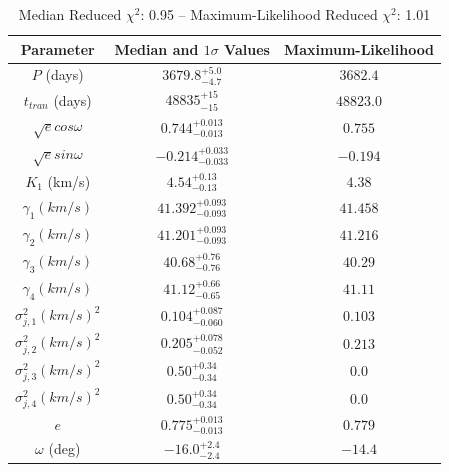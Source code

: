 \documentclass{article}
\begin{document}
\begin{table}
\centering
\caption{Median Reduced $\chi^2$: 0.95 -- Maximum-Likelihood Reduced $\chi^2$: 1.01}
\begin{tabular}{| c | c | c |}
\hline
Parameter & Median and $1 \sigma$ Values & Maximum-Likelihood \\
\hline
$P$ (days) & $3679.8^{+5.0}_{-4.7}$ & $3682.4$ \\
\hline
$t_{tran}$ (days) & $48835^{+15}_{-15}$ & $48823.0$ \\
\hline
$\sqrt{e} cos\omega$ & $0.744^{+0.013}_{-0.013}$ & $0.755$ \\
\hline
$\sqrt{e} sin\omega$ & $-0.214^{+0.033}_{-0.033}$ & $-0.194$ \\
\hline
$K_1$ (km/s) & $4.54^{+0.13}_{-0.13}$ & $4.38$ \\
\hline
$\gamma_{1} (km/s)$ & $41.392^{+0.093}_{-0.093}$ & $41.458$ \\
\hline
$\gamma_{2} (km/s)$ & $41.201^{+0.093}_{-0.093}$ & $41.216$ \\
\hline
$\gamma_{3} (km/s)$ & $40.68^{+0.76}_{-0.76}$ & $40.29$ \\
\hline
$\gamma_{4} (km/s)$ & $41.12^{+0.66}_{-0.65}$ & $41.11$ \\
\hline
$\sigma^2_{j,1} (km/s)^2$ & $0.104^{+0.087}_{-0.060}$ & $0.103$ \\
\hline
$\sigma^2_{j,2} (km/s)^2$ & $0.205^{+0.078}_{-0.052}$ & $0.213$ \\
\hline
$\sigma^2_{j,3} (km/s)^2$ & $0.50^{+0.34}_{-0.34}$ & $0.0$ \\
\hline
$\sigma^2_{j,4} (km/s)^2$ & $0.50^{+0.34}_{-0.34}$ & $0.0$ \\
\hline
$e$ & $0.775^{+0.013}_{-0.013}$ & $0.779$ \\
\hline
$\omega$ (deg) & $-16.0^{+2.4}_{-2.4}$ & $-14.4$ \\
\hline
\end{tabular}
\end{table}

\clearpage
\end{document}
